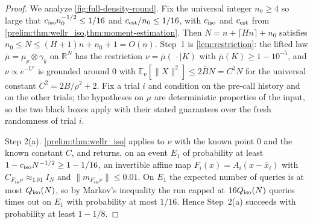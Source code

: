 \documentclass[11pt]{article}
\numberwithin{equation}{section}
\theoremstyle{definition}
\newcommand{\R}{\mathbb{R}}
\newcommand{\E}[2]{\mathbb{E}_{#1}\left[#2\right]}
\begin{document}
\begin{proof}
We analyze \cref{fig:full-density-round}.
Fix the universal integer $n_0\geq4$ so large that
$c_{\rm iso}n_0^{-1/2}\leq1/16$ and
$c_{\rm est}/n_0\leq1/16$, with
$c_{\rm iso}$ and
$c_{\rm est}$ from \cref{prelim:thm:wellr_iso,thm:moment-estimation}.
Then $N=n+\lceil Hn\rceil+n_0$ satisfies
$n_0\leq N\leq(H+1)n+n_0+1=O(n)$.
Step~1 is \cref{lem:restriction}: the lifted law
$\bar\mu=\mu_\rho\otimes\gamma_k$ on
$\R^N$ has the restriction
$\nu=\bar\mu(\,\cdot\mid K)$ with
$\bar\mu(K)\geq1-10^{-5}$, and
$\nu\propto e^{-U'}$ is grounded around
$0$ with
$\E{\nu}{\|X\|^2}\leq2\bar BN=C^2N$ for the universal constant
$C^2=2B/\rho^2+2$.
Fix a trial $i$ and condition on the pre-call history and on the other trials;
the hypotheses on
$\mu$ are deterministic properties of the input, so the two black boxes apply
with their stated guarantees over the fresh randomness of trial
$i$.

Step 2(a).
\cref{prelim:thm:wellr_iso} applies to $\nu$ with the known point
$0$ and the known constant
$C$, and returns, on an event
$E_1$ of probability at least
$1-c_{\rm iso}N^{-1/2}\geq1-1/16$, an invertible affine map
$F_i(x)=A_i(x-\bar x_i)$ with
$C_{F_{i\#}\nu}\approx_{1.01}I_N$ and
$\|m_{F_{i\#}\nu}\|\leq0.01$.
On $E_1$ the expected number of queries is at most
$Q_{\rm iso}(N)$, so by Markov's inequality the run capped at
$16Q_{\rm iso}(N)$ queries times out on
$E_1$ with probability at most
$1/16$.
Hence Step~2(a) succeeds with probability at least $1-1/8$.


\end{proof}
\end{document}
